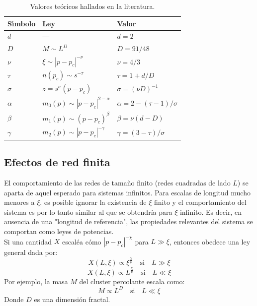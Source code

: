 \documentclass[%
 reprint,
 amsmath,amssymb,
 aps,
spanish]{revtex4-1}
\begin{document}
\begin{table}[h]
\caption{\label{tabla:referencias}%
Valores te\'oricos hallados en la literatura.
}
\begin{ruledtabular}
\begin{tabular}{lll}
\\[-5pt]
 S\'\i mbolo     & Ley                        & Valor                          \\
\hline
$d$             &   ---                         & $d=2$                        \\
$D$             & $M\sim L^{D}$                 & $D=91/48$                    \\
$\nu$           & $\xi\sim|p-p_c|^{-\nu}$       & $\nu=4/3$                    \\
$\tau$          & $n(p_c)\sim s^{-\tau}$        & $\tau=1+d/D$                 \\
$\sigma$        & $z=s^\sigma(p-p_c)$           & $\sigma=(\nu D)^{-1}$        \\
$\alpha$        & $m_0(p)\sim|p-p_c|^{2-\alpha}$& $\alpha=2-(\tau-1)/\sigma$   \\
$\beta$         & $m_1(p)\sim(p-p_c)^\beta$     & $\beta=\nu(d-D)$             \\
$\gamma$        & $m_2(p)\sim|p-p_c|^{-\gamma}$ & $\gamma=(3-\tau)/\sigma$     \\
\end{tabular}
\end{ruledtabular}
\end{table}

\subsection{\label{scaling}Efectos de red finita}
El comportamiento de las redes de tamaño finito (redes cuadradas de lado $L$) se aparta de aquel esperado para sistemas infinitos. Para escalas de longitud mucho menores a $\xi$, es posible ignorar la existencia de $\xi$ finito y el comportamiento del sistema es por lo tanto similar al que se obtendría para $\xi$ infinito. Es decir, en ausencia de una "longitud de referencia", las propiedades relevantes del sistema se comportan como leyes de potencias. \\
Si una cantidad $X$ escaléa cómo $|p-p_c|^{-\chi}$ para $L \gg \xi$, entonces obedece una ley general dada por:
\begin{equation}
\label{ecu:ley_de_escala}
X(L, \xi) \propto \xi^{\frac{\chi}{\nu}} \quad \textrm{si} \quad L \gg \xi
\end{equation} 
\begin{equation}
\label{ecu:ley_de_escala}
X(L, \xi) \propto L^{\frac{\chi}{\nu}} \quad \textrm{si} \quad L \ll \xi
\end{equation} 
Por ejemplo, la masa $M$ del cluster percolante escala como:
\begin{equation}
\label{ecu:masa}
M \propto L^D \quad \textrm{si} \quad L \ll \xi
\end{equation} 
Donde $D$ es una dimensión fractal.
\end{document}
